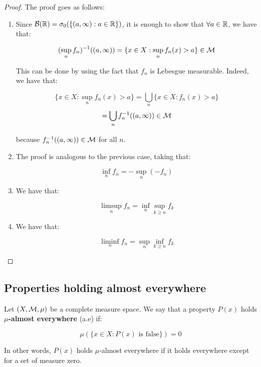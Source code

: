 \begin{proof}
    The proof goes as follows:

    \begin{enumerate}
        \item Since $\mathcal{B}(\mathbb{R}) = \sigma_0(\{(a, \infty): a \in \mathbb{R}\})$, it is enough to show that
        $\forall a \in \mathbb{R}$, we have that:

        $$(\sup_{n} f_n)^{-1}((a, \infty))= \{x \in X: \sup_{n} f_n(x) > a\} \in \mathcal{M}$$
    
        This can be done by using the fact that $f_n$ is Lebesgue measurable. 
        Indeed, we have that:
        
        $$\{x \in X: \sup_{n} f_n(x) > a\} = \bigcup_{n} \{x \in X: f_n(x) > a\} $$
        $$ = \bigcup_{n} f_n^{-1}((a, \infty)) \in \mathcal{M}$$

        because $f_n^{-1}((a, \infty)) \in \mathcal{M}$ for all $n$.
    
        \item The proof is analogous to the previous case, taking that:
        
        $$\inf_{n} f_n = -\sup_{n} (-f_n)$$

        \item We have that:
        
        $$\limsup_{n} f_n = \inf_{n} \sup_{k \geq n} f_k$$

        \item We have that:
        
        $$\liminf_{n} f_n = \sup_{n} \inf_{k \geq n} f_k$$

    \end{enumerate}
\end{proof}

\subsection{Properties holding almost everywhere}

\begin{fdefinition}
    Let $(X, \mathcal{M}, \mu)$ be a complete measure space. 
    We say that a property $P(x)$ holds \textbf{$\mu$-almost everywhere}
    (a.e) if:
    
    $$\mu(\{x \in X: P(x) \text{ is false}\}) = 0$$

    In other words, $P(x)$ holds $\mu$-almost everywhere if it holds everywhere except
    for a set of measure zero.

\end{fdefinition}

